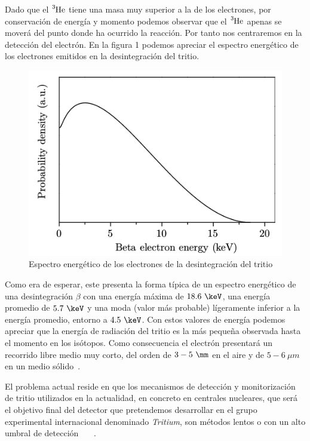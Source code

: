 Dado que el $\ce{^3He}$  tiene una masa muy superior a la de los electrones, por conservación de energía y momento podemos observar que el $\ce{^3He}$  apenas se moverá del punto donde ha ocurrido la reacción. Por tanto nos centraremos en la detección del electrón. En la figura 1 podemos apreciar el espectro energético de los electrones emitidos en la desintegración del tritio.

\begin{figure}[hbtp]
\includegraphics[scale=0.6]{Espectro.png}
\centering
\caption{Espectro energético de los electrones de la desintegración del tritio ~\cite{TesisTritio}\label{Espectrotritio}}
\end{figure}

Como era de esperar, este presenta la forma típica de un espectro energético de una desintegración $\beta$ con una energía máxima de $18.6~\keV$, una energía promedio de $5.7~\keV$ y una moda (valor más probable) lígeramente inferior a la energía promedio, entorno a $4.5~\keV$. Con estos valores de energía podemos apreciar que la energía de radiación del tritio es la más pequeña observada hasta el momento en los isótopos. Como consecuencia el electrón presentará un recorrido libre medio muy corto, del orden de $3-5~\mm$ en el aire y de $5-6~\mu m$ en un medio sólido~\cite{Isotopos}.

El problema actual reside en que los mecanismos de detección y monitorización de tritio utilizados en la actualidad, en concreto en centrales nucleares, que será el objetivo final del detector que pretendemos desarrollar en el grupo experimental internacional denominado \textit{Tritium}, son métodos lentos o con un alto umbral de detección ~\cite{limiteMB}~\cite{Limitetiempo}~\cite{Limite}. 

